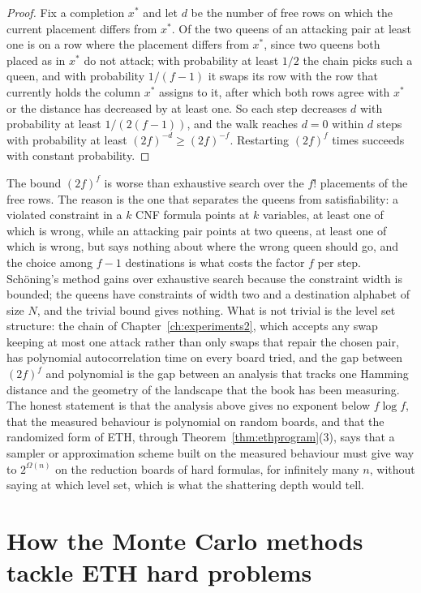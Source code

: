 \begin{proof}
Fix a completion $x^*$ and let $d$ be the number of free rows on which the current placement differs from $x^*$. Of the two queens of an attacking pair at least one is on a row where the placement differs from $x^*$, since two queens both placed as in $x^*$ do not attack; with probability at least $1/2$ the chain picks such a queen, and with probability $1/(f - 1)$ it swaps its row with the row that currently holds the column $x^*$ assigns to it, after which both rows agree with $x^*$ or the distance has decreased by at least one. So each step decreases $d$ with probability at least $1 / (2 (f - 1))$, and the walk reaches $d = 0$ within $d$ steps with probability at least $(2 f)^{-d} \ge (2 f)^{-f}$. Restarting $(2 f)^f$ times succeeds with constant probability.
\end{proof}

The bound $(2f)^f$ is worse than exhaustive search over the $f!$ placements of the free rows. The reason is the one that separates the queens from satisfiability: a violated constraint in a $k$ CNF formula points at $k$ variables, at least one of which is wrong, while an attacking pair points at two queens, at least one of which is wrong, but says nothing about where the wrong queen should go, and the choice among $f - 1$ destinations is what costs the factor $f$ per step. Sch\"oning's method gains over exhaustive search because the constraint width is bounded; the queens have constraints of width two and a destination alphabet of size $N$, and the trivial bound gives nothing. What is not trivial is the level set structure: the chain of Chapter~\ref{ch:experiments2}, which accepts any swap keeping at most one attack rather than only swaps that repair the chosen pair, has polynomial autocorrelation time on every board tried, and the gap between $(2f)^f$ and polynomial is the gap between an analysis that tracks one Hamming distance and the geometry of the landscape that the book has been measuring. The honest statement is that the analysis above gives no exponent below $f \log f$, that the measured behaviour is polynomial on random boards, and that the randomized form of ETH, through Theorem~\ref{thm:ethprogram}(3), says that a sampler or approximation scheme built on the measured behaviour must give way to $2^{\Omega(n)}$ on the reduction boards of hard formulas, for infinitely many $n$, without saying at which level set, which is what the shattering depth would tell.

\section{How the Monte Carlo methods tackle ETH hard problems}

